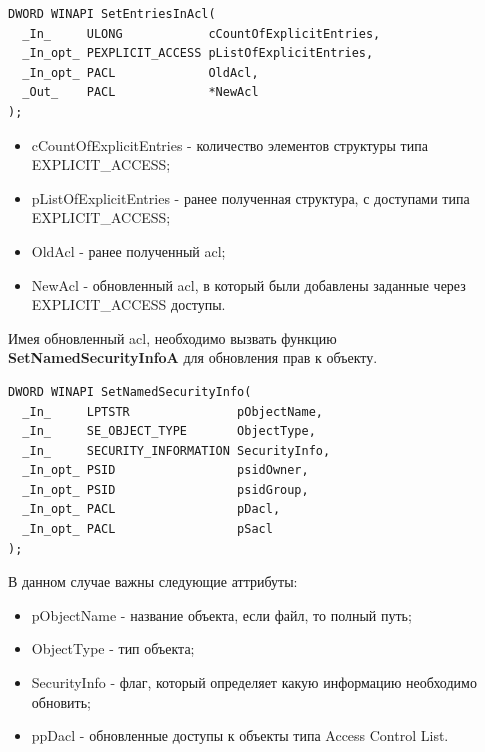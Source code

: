 \begin{lstlisting}[language={}, caption={Структура SetEntriesInAcl}]
DWORD WINAPI SetEntriesInAcl(
  _In_     ULONG            cCountOfExplicitEntries,
  _In_opt_ PEXPLICIT_ACCESS pListOfExplicitEntries,
  _In_opt_ PACL             OldAcl,
  _Out_    PACL             *NewAcl
);
\end{lstlisting}
\begin{itemize}
\item cCountOfExplicitEntries - количество элементов структуры типа EXPLICIT\_ACCESS;
\item pListOfExplicitEntries - ранее полученная структура, с доступами типа EXPLICIT\_ACCESS;
\item OldAcl - ранее полученный acl;
\item NewAcl - обновленный acl, в который были добавлены заданные через EXPLICIT\_ACCESS доступы.
\end{itemize}
Имея обновленный acl, необходимо вызвать функцию \textbf{SetNamedSecurityInfoA}\cite{SetNamedSecurityInfo}  для обновления прав к объекту.
\begin{lstlisting}[language={}, caption={Структура SetNamedSecurityInfo}]
DWORD WINAPI SetNamedSecurityInfo(
  _In_     LPTSTR               pObjectName,
  _In_     SE_OBJECT_TYPE       ObjectType,
  _In_     SECURITY_INFORMATION SecurityInfo,
  _In_opt_ PSID                 psidOwner,
  _In_opt_ PSID                 psidGroup,
  _In_opt_ PACL                 pDacl,
  _In_opt_ PACL                 pSacl
);
\end{lstlisting}
В данном случае важны следующие аттрибуты:
\begin{itemize}
\item pObjectName - название объекта, если файл, то полный путь;
\item ObjectType - тип объекта;
\item SecurityInfo - флаг, который определяет какую информацию необходимо обновить;
\item ppDacl - обновленные доступы к объекты типа Access Control List.
\end{itemize}


